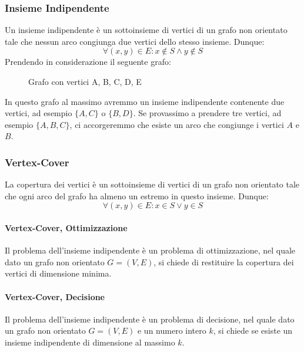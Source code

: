     \subsubsection{Insieme Indipendente}
        Un insieme indipendente è un sottoinsieme di vertici di un grafo non orientato tale che nessun arco congiunga due vertici dello stesso insieme. Dunque: $$
            \forall(x,y)\in E: x\not\in S\land y\not\in S
        $$
        Prendendo in considerazione il seguente grafo:
        \begin{figure}
            \centering
            \caption{Grafo con vertici A, B, C, D, E}
        \end{figure}
        In questo grafo al massimo avremmo un insieme indipendente contenente due vertici, ad esempio $\{A,C\}$ o $\{B,D\}$. Se provassimo a prendere tre vertici, ad esempio $\{A,B,C\}$, ci accorgeremmo che esiste un arco che congiunge i vertici $A$ e $B$. 
    \subsubsection{Vertex-Cover}
        La copertura dei vertici è un sottoinsieme di vertici di un grafo non orientato tale che ogni arco del grafo ha almeno un estremo in questo insieme. Dunque: $$
            \forall(x,y)\in E: x\in S\lor y\in S
        $$
        \paragraph{Vertex-Cover, Ottimizzazione} Il problema dell'insieme indipendente è un problema di ottimizzazione, nel quale dato un grafo non orientato $G=(V,E)$, si chiede di restituire la copertura dei vertici di dimensione minima.
        \paragraph{Vertex-Cover, Decisione} Il problema dell'insieme indipendente è un problema di decisione, nel quale dato un grafo non orientato $G=(V,E)$ e un numero intero $k$, si chiede se esiste un insieme indipendente di dimensione al massimo $k$.
